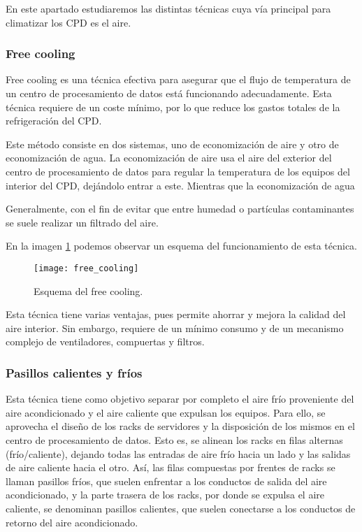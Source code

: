 En este apartado estudiaremos las distintas técnicas cuya vía principal para climatizar los CPD es el aire.

\subsubsection{Free cooling}

Free cooling es una técnica efectiva para asegurar que el flujo de temperatura de un centro de procesamiento de datos está funcionando adecuadamente. Esta técnica requiere de un coste mínimo, por lo que reduce los gastos totales de la refrigeración del CPD.

Este método consiste en dos sistemas, uno de economización de aire y otro de economización de agua. La economización de aire usa el aire del exterior del centro de procesamiento de datos para regular la temperatura de los equipos del interior del CPD, dejándolo entrar a este. Mientras que la economización de agua %


Generalmente, con el fin de evitar que entre humedad o partículas contaminantes se suele realizar un filtrado del aire.

En la imagen \ref{free_coling} podemos observar un esquema del funcionamiento de esta técnica.

\begin{figure}
    \begin{center}
    \caption{Esquema del free cooling.}
    \label{free_coling}
    \texttt{[image: free\_cooling]}
    \end{center}
\end{figure}

Esta técnica tiene varias ventajas, pues permite ahorrar y mejora la calidad del aire interior. Sin embargo, requiere de un mínimo consumo y de un mecanismo complejo de ventiladores, compuertas y filtros.

\subsubsection{Pasillos calientes y fríos}

Esta técnica tiene como objetivo separar por completo el aire frío proveniente del aire acondicionado y el aire caliente que expulsan los equipos. Para ello, se aprovecha el diseño de los racks de servidores y la disposición de los mismos en el centro de procesamiento de datos. Esto es, se alinean los racks en filas alternas (frío/caliente), dejando todas las entradas de aire frío hacia un lado y las salidas de aire caliente hacia el otro. Así, las filas compuestas por frentes de racks se llaman pasillos fríos, que suelen enfrentar a los conductos de salida del aire acondicionado, y la parte trasera de los racks, por donde se expulsa el aire caliente, se denominan pasillos calientes, que suelen conectarse a los conductos de retorno del aire acondicionado.

